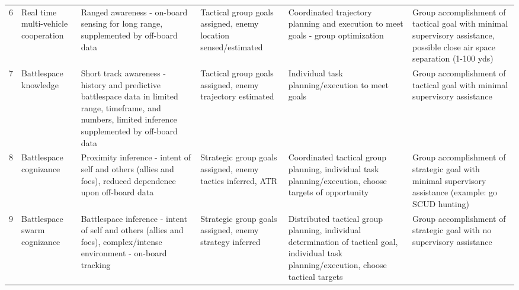 \begin{table}
\begin{tabular}{r L{0.1\textwidth} L{0.175\textwidth} L{0.175\textwidth} L{0.175\textwidth} L{0.175\textwidth}}
        6   & Real time multi-vehicle cooperation           & Ranged awareness - on-board sensing for long range, supplemented by off-board data                                                                            & Tactical group goals assigned, enemy location sensed/estimated                                                                                                                                                                & Coordinated trajectory planning and execution to meet goals - group optimization                                                              & Group accomplishment of tactical goal with minimal supervisory assistance, possible close air space separation (1-100 yds) \\
        7   & Battlespace knowledge                         & Short track awareness - history and predictive battlespace data in limited range, timeframe, and numbers, limited inference supplemented by off-board data    & Tactical group goals assigned, enemy trajectory estimated                                                                                                                                                                     & Individual task planning/execution to meet goals                                                                                              & Group accomplishment of tactical goal with minimal supervisory assistance \\
        8   & Battlespace cognizance                        & Proximity inference - intent of self and others (allies and foes), reduced dependence upon off-board data                                                     & Strategic group goals assigned, enemy tactics inferred, ATR                                                                                                                                                                   & Coordinated tactical group planning, individual task planning/execution, choose targets of opportunity                                        & Group accomplishment of strategic goal with minimal supervisory assistance (example: go SCUD hunting) \\
        9   & Battlespace swarm cognizance                  & Battlespace inference - intent of self and others (allies and foes), complex/intense environment - on-board tracking                                          & Strategic group goals assigned, enemy strategy inferred                                                                                                                                                                       & Distributed tactical group planning, individual determination of tactical goal, individual task planning/execution, choose tactical targets   & Group accomplishment of strategic goal with no supervisory assistance \\

\end{tabular}
\end{table}
